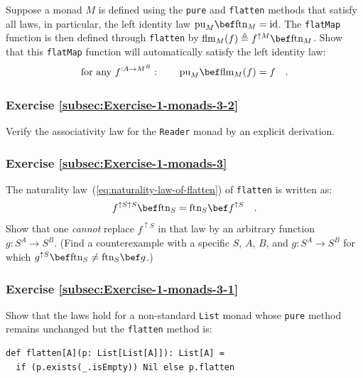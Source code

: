 Suppose a monad $M$ is defined using the \lstinline!pure! and \lstinline!flatten!
methods that satisfy all laws, in particular, the left identity law
$\text{pu}_{M}\bef\text{ftn}_{M}=\text{id}$. The \lstinline!flatMap!
function is then defined through \lstinline!flatten! by $\text{flm}_{M}(f)\triangleq f^{\uparrow M}\bef\text{ftn}_{M}$.
Show that this \lstinline!flatMap! function will automatically satisfy
the left identity law: 
\[
\text{for any }f^{:A\rightarrow M^{B}}:\quad\quad\text{pu}_{M}\bef\text{flm}_{M}(f)=f\quad.
\]


\subsubsection{Exercise \label{subsec:Exercise-1-monads-3-2}\ref{subsec:Exercise-1-monads-3-2}}

Verify the associativity law for the \lstinline!Reader! monad by
an explicit derivation.

\subsubsection{Exercise \label{subsec:Exercise-1-monads-3}\ref{subsec:Exercise-1-monads-3}}

The naturality law~(\ref{eq:naturality-law-of-flatten}) of \lstinline!flatten!
is written as:
\[
f^{\uparrow S\uparrow S}\bef\text{ftn}_{S}=\text{ftn}_{S}\bef f^{\uparrow S}\quad.
\]
Show that one \emph{cannot} replace $f^{\uparrow S}$ in that law
by an arbitrary function $g:S^{A}\rightarrow S^{B}$. (Find a counterexample
with a specific $S$, $A$, $B$, and $g:S^{A}\rightarrow S^{B}$
for which $g^{\uparrow S}\bef\text{ftn}_{S}\neq\text{ftn}_{S}\bef g$.)

\subsubsection{Exercise \label{subsec:Exercise-1-monads-3-1}\ref{subsec:Exercise-1-monads-3-1}}

Show that the laws hold for a non-standard \lstinline!List! monad
whose \lstinline!pure! method remains unchanged but the \lstinline!flatten!
method is:
\begin{lstlisting}
def flatten[A](p: List[List[A]]): List[A] =
  if (p.exists(_.isEmpty)) Nil else p.flatten
\end{lstlisting}


